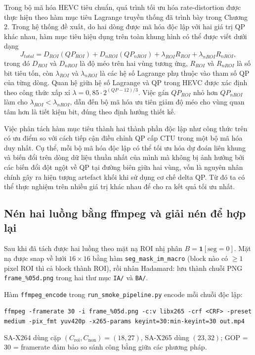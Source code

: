 Trong bộ mã hóa HEVC tiêu chuẩn, quá trình tối ưu hóa rate-distortion được thực hiện theo hàm mục tiêu Lagrange truyền thống đã trình bày trong Chương 2. Trong hệ thống đề xuất, do hai dòng được mã hóa độc lập với hai giá trị QP khác nhau, hàm mục tiêu hiệu dụng trên toàn khung hình có thể được viết dưới dạng
\begin{equation}
\label{eq:rd-extended}
J_{total} = D_{ROI}(QP_{ROI}) + D_{nROI}(QP_{nROI}) + \lambda_{ROI} R_{ROI} + \lambda_{nROI} R_{nROI},
\end{equation}
trong đó $D_{ROI}$ và $D_{nROI}$ là độ méo trên hai vùng tương ứng, $R_{ROI}$ và $R_{nROI}$ là số bit tiêu tốn, còn $\lambda_{ROI}$ và $\lambda_{nROI}$ là các hệ số Lagrange phụ thuộc vào tham số QP của từng dòng. Quan hệ giữa hệ số Lagrange và QP trong HEVC được xác định theo công thức xấp xỉ $\lambda = 0,85 \cdot 2^{(QP-12)/3}$. Việc gán $QP_{ROI}$ nhỏ hơn $QP_{nROI}$ làm cho $\lambda_{ROI} < \lambda_{nROI}$, dẫn đến bộ mã hóa ưu tiên giảm độ méo cho vùng quan tâm hơn là tiết kiệm bit, đúng theo định hướng thiết kế.
 
Việc phân tách hàm mục tiêu thành hai thành phần độc lập như công thức trên có ưu điểm so với cách tiếp cận điều chỉnh QP cấp CTU trong một bộ mã hóa duy nhất. Cụ thể, mỗi bộ mã hóa độc lập có thể tối ưu hóa dự đoán liên khung và biến đổi trên dòng dữ liệu thuần nhất của mình mà không bị ảnh hưởng bởi các biến đổi đột ngột về QP tại đường biên giữa hai vùng, vốn là nguyên nhân chính gây ra hiện tượng artefact khối khi sử dụng cơ chế delta QP. Từ đó ta có thể thực nghiệm trên nhiều giá trị khác nhau để cho ra kết quả tối ưu nhất.
 
\subsection{Nén hai luồng bằng ffmpeg và giải nén để hợp lại }
\label{sec:ccnet_encode}

Sau khi đã tách được hai luồng theo mặt nạ ROI nhị phân $B = \mathbf{1}[\text{seg}=0]$. Mặt nạ được snap về lưới $16\times16$ bằng hàm \texttt{seg\_mask\_im\_macro} (block nào có $\geq 1$ pixel ROI thì cả block thành ROI), rồi nhân Hadamard:
lưu thành chuỗi PNG \texttt{frame\_\%05d.png} trong hai thư mục \texttt{IA/} và \texttt{BA/}.

Hàm \texttt{ffmpeg\_encode} trong \texttt{run\_smoke\_pipeline.py} encode mỗi chuỗi độc lập:
\begin{center}\small
\texttt{ffmpeg -framerate 30 -i frame\_\%05d.png -c:v libx265 -crf <CRF> -preset medium -pix\_fmt yuv420p -x265-params keyint=30:min-keyint=30 out.mp4}
\end{center}
SA-X264 dùng cặp $(C_{\mathrm{roi}}, C_{\mathrm{non}}) = (18, 27)$, SA-X265 dùng $(23, 32)$; GOP = 30 = framerate đảm bảo so sánh công bằng giữa các phương pháp.


